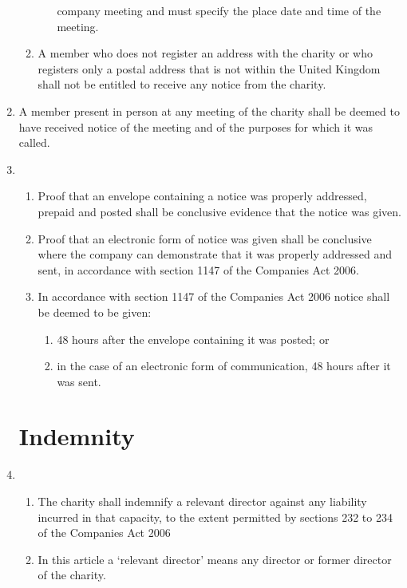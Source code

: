 \documentclass{article}
\begin{document}
\begin{enumerate}[label=\arabic*, start=23]
\begin{enumerate}[label=(\arabic*)]
\begin{enumerate}[label=(\alph*)]
            company meeting and must specify the place date and
            time of the meeting.
        \end{enumerate}
        \item A member who does not register an address with the charity
        or who registers only a postal address that is not within the
        United Kingdom shall not be entitled to receive any notice from
        the charity.
    \end{enumerate}
    \item A member present in person at any meeting of the charity shall be
    deemed to have received notice of the meeting and of the purposes for
    which it was called.
    \item \begin{enumerate}[label=(\arabic*)]
        \item Proof that an envelope containing a notice was properly
        addressed, prepaid and posted shall be conclusive evidence that
        the notice was given.
        \item Proof that an electronic form of notice was given shall be
        conclusive where the company can demonstrate that it was
        properly addressed and sent, in accordance with section 1147 of
        the Companies Act 2006.
        \item In accordance with section 1147 of the Companies Act 2006
        notice shall be deemed to be given:
        \begin{enumerate}[label=(\alph*)]
            \item 48 hours after the envelope containing it was posted; or
            \item in the case of an electronic form of communication, 48
            hours after it was sent.
        \end{enumerate}
    \end{enumerate}
    
    \section{Indemnity}
    \item \begin{enumerate}[label=(\arabic*)]
        \item The charity shall indemnify a relevant director against any
        liability incurred in that capacity, to the extent permitted by
        sections 232 to 234 of the Companies Act 2006
        \item In this article a `relevant director' means any director or former
        director of the charity.
    \end{enumerate}
    

\end{enumerate}
\end{document}

